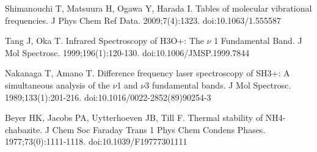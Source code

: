 \documentclass[12pt]{report}
\begin{document}
\begin{thebibliography}{13}
Shimanouchi T, Matsuura H, Ogawa Y, Harada I. Tables of molecular vibrational frequencies. J Phys Chem Ref Data. 2009;7(4):1323. doi:10.1063/1.555587

Tang J, Oka T. Infrared Spectroscopy of H3O+: The $\nu$ 1 Fundamental Band. J Mol Spectrosc. 1999;196(1):120-130. doi:10.1006/JMSP.1999.7844

Nakanaga T, Amano T. Difference frequency laser spectroscopy of SH3+: A simultaneous analysis of the $\nu$1 and $\nu$3 fundamental bands. J Mol Spectrosc. 1989;133(1):201-216. doi:10.1016/0022-2852(89)90254-3

 Beyer HK, Jacobs PA, Uytterhoeven JB, Till F. Thermal stability of NH4-chabazite. J Chem Soc Faraday Trans 1 Phys Chem Condens Phases. 1977;73(0):1111-1118. doi:10.1039/F19777301111



\end{thebibliography}
\end{document}
